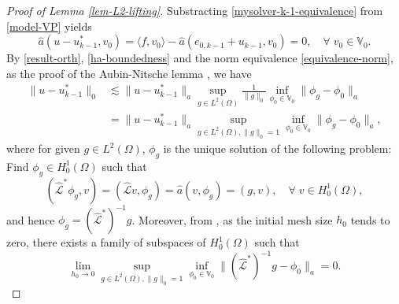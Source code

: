 \documentclass[preprint,times]{elsarticle}%
\numberwithin{algorithm}{section}
\numberwithin{equation}{section}
\newcommand{\anorm}[1]{\|#1\|_a}
\newcommand{\ha}{\hat{a}}
\newcommand{\hmcL}{\hat{\mathcal{L}}}
\newcommand{\mbV}{\mathbb{V}}
\begin{document}
\begin{proof}[Proof of Lemma \ref{lem-L2-lifting}]
	Substracting \eqref{mysolver-k-1-equivalence} from \eqref{model-VP} yields 
	\begin{equation}\label{result-orth}
		\ha(u-u_{k-1}^*,v_0) = \langle f, v_0 \rangle- \ha(e_{0,k-1}+u_{k-1},v_0) = 0, \quad \forall \; v_0 \in \mbV_0. 
	\end{equation}
By \eqref{result-orth}, \eqref{ha-boundedness} and the norm equivalence \eqref{equivalence-norm}, as the proof of the Aubin-Nitsche lemma \cite[Theorem 3.2.4]{Ciarlet02Book}, we have 
	\begin{align}
		\|u-u_{k-1}^*\|_0 &\lesssim  \|u-u_{k-1}^*\|_a \sup_{g \in L^2(\Omega)} \frac{1}{\|g\|_0}\inf_{\phi_0 \in \mbV_0}\|\phi_g - \phi_0\|_a \label{aubin-nitsche-1}\\
		&= \anorm{u-u_{k-1}^*}\sup_{g \in L^2(\Omega),\|g\|_0 = 1}\inf_{\phi_0 \in \mbV_0}\|\phi_g - \phi_0\|_a, \label{aubin-nitsche-2}
	\end{align}
where for given $g \in L^2(\Omega)$, $\phi_g$ is the unique solution of the following problem: Find $\phi_g \in H_0^1(\Omega)$ such that 
	\begin{equation}\label{aux-VP}
		(\hmcL^* \phi_g,v) = (\hmcL v,\phi_g) = \ha(v,\phi_g) = (g,v), \quad \forall \; v \in H_0^1(\Omega), 
	\end{equation}
and hence $\phi_g = (\hmcL^*)^{-1}g$. 
Moreover, from  \cite[Eqn. (2.4.5)]{Ciarlet02Book}, as the initial mesh size $h_0$ tends to zero, there exists a family of subspaces of $H_0^1(\Omega)$ such that  
	\begin{equation*}
		\lim_{h_0 \rightarrow 0}\sup_{g \in L^2(\Omega),\|g\|_0 = 1}\inf_{\phi_0 \in \mbV_0}\anorm{(\hmcL^*)^{-1}g-\phi_0} = 0. 
	\end{equation*}


\end{proof}
\end{document}
